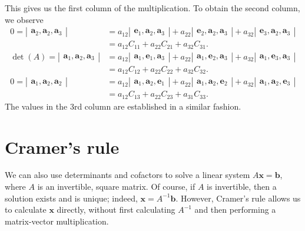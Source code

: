 \documentclass[12pt]{article}
\newcommand{\ba}{\mathbf{a}}
\newcommand{\bb}{\mathbf{b}}
\newcommand{\be}{\mathbf{e}}
\newcommand{\bx}{\mathbf{x}}
\newcommand{\vmat}[1]{\left|\begin{matrix}#1\end{matrix}\right|}
\begin{document}
This gives us the first column of the multiplication.  To obtain the
second column, we observe
\begin{align*}
  0=\vmat{ \ba_2, \ba_2, \ba_3} &= a_{12} \vmat{ \be_1, \ba_2, \ba_3} + a_{22}
  \vmat{ \be_2, \ba_2, \ba_3} + a_{32} \vmat{\be_3,\ba_2, \ba_3}\\
  &=a_{12} C_{11} + a_{22} C_{21} + a_{32} C_{31} .\\
  \det(A)=\vmat{ \ba_1, \ba_2, \ba_3} &= a_{12} \vmat{ \ba_1,\be_1, \ba_3} +
  a_{22}
  \vmat{ \ba_1,\be_2, \ba_3} + a_{32} \vmat{\ba_1,\be_3, \ba_3}\\
  &=a_{12} C_{12} + a_{22} C_{22} + a_{32}
  C_{32} .\\
  0=\vmat{ \ba_1, \ba_2, \ba_2} &= a_{12} \vmat{ \ba_1, \ba_2, \be_1} + a_{22}
  \vmat{ \ba_1, \ba_2, \be_2} + a_{32} \vmat{\ba_1,\ba_2, \be_3}\\
  &=a_{12} C_{13} + a_{22} C_{23} + a_{31} C_{33} .
\end{align*}
The values in the 3rd column are established in a similar fashion.
\section{Cramer's rule}
We can also use determinants and cofactors to solve a linear system
$A\bx=\bb$, where $A$ is an invertible, square matrix.  
Of course, if $A$ is invertible, then a solution exists and is
unique;  indeed, $\bx = A^{-1} \bb$.  However, Cramer's rule allows us
to calculate $\bx$ directly, without first calculating $A^{-1}$ and
then performing a matrix-vector multiplication.
\end{document}
